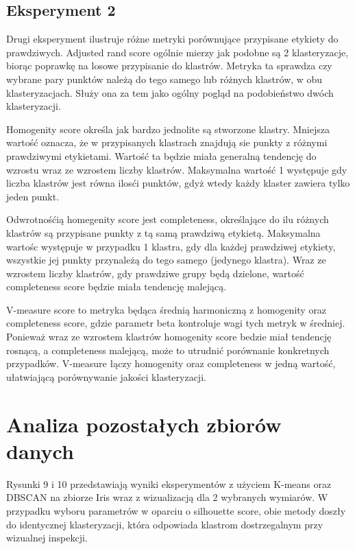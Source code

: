 \documentclass[12pt]{article}
\begin{document}
\subsection*{Eksperyment 2}

Drugi eksperyment ilustruje różne metryki porównujące przypisane etykiety do prawdziwych. 
Adjusted rand score ogólnie mierzy jak podobne są 2 klasteryzacje, biorąc poprawkę na losowe przypisanie do klastrów. 
Metryka ta sprawdza czy wybrane pary punktów należą do tego samego lub różnych klastrów, w obu klasteryzacjach. 
Służy ona za tem jako ogólny pogląd na podobieństwo dwóch klasteryzacji. 

Homogenity score określa jak bardzo jednolite są stworzone klastry. Mniejsza wartość oznacza, że w przypisanych klastrach znajdują sie punkty z różnymi prawdziwymi etykietami.
Wartość ta będzie miała generalną tendencję do wzrostu wraz ze wzrostem liczby klastrów. Maksymalna wartość 1 występuje gdy liczba klastrów jest równa ilosći punktów, gdyż wtedy każdy klaster zawiera tylko jeden punkt.

Odwrotnośćią homegenity score jest completeness, określające do ilu różnych klastrów są przypisane punkty z tą samą prawdziwą etykietą. 
Maksymalna wartośc występuje w przypadku 1 klastra, gdy dla każdej prawdziwej etykiety, wszystkie jej punkty przynależą do tego samego (jedynego klastra).
Wraz ze wzrostem liczby klastrów, gdy prawdziwe grupy będą dzielone, wartość completeness score będzie miała tendencję malejącą.

V-measure score to metryka będąca średnią harmoniczną z homogenity oraz completeness score, gdzie parametr beta kontroluje wagi tych metryk w średniej.
Ponieważ wraz ze wzrostem klastrów homogenity score bedzie miał tendencję rosnącą, a completeness malejącą, może to utrudnić porównanie konkretnych przypadków.
V-measure łączy homogenity oraz completeness w jedną wartość, ułatwiającą porównywanie jakości klasteryzacji.


\newpage
\section{Analiza pozostałych zbiorów danych}

Rysunki 9 i 10 przedstawiają wyniki eksperymentów z użyciem K-means oraz DBSCAN na zbiorze Iris wraz z wizualizacją dla 2 wybranych wymiarów.
W przypadku wyboru parametrów w oparciu o silhouette score, obie metody doszły do identycznej klasteryzacji, która odpowiada klastrom dostrzegalnym przy wizualnej inspekcji.
\end{document}
